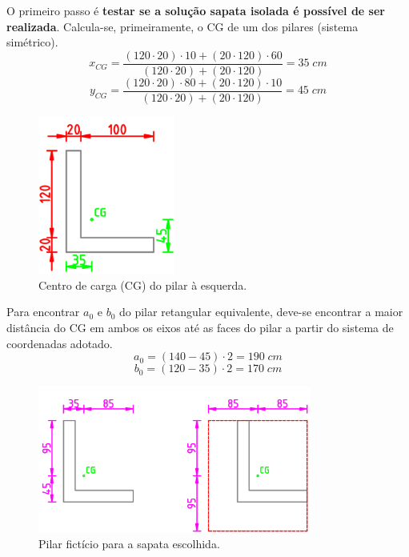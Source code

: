 O primeiro passo é \textbf{testar se a solução sapata isolada é possível de ser realizada}. Calcula-se, primeiramente, o CG de um dos pilares (sistema simétrico).
$$x_{CG}=\frac{(120\cdot20)\cdot10+(20\cdot120)\cdot60}{(120\cdot20)+(20\cdot120)}=35\;cm$$ 
$$y_{CG}=\frac{(120\cdot20)\cdot80+(20\cdot120)\cdot10}{(120\cdot20)+(20\cdot120)}=45\;cm$$
\begin{figure}[H]
	\begin{center}
	\caption{Centro de carga (CG) do pilar à esquerda.}
    	\includegraphics[width=0.4\textwidth]{Fundacoes-rasas-ou-diretas/Imagens/Exercicio-1-Sapata-conjugada-parte2.png}
	\end{center}
\end{figure}

Para encontrar $a_0$ e $b_0$ do pilar retangular equivalente, deve-se encontrar a maior distância do CG em ambos os eixos até as faces do pilar a partir do sistema de coordenadas adotado.
$$a_0=(140-45)\cdot2=190\;cm$$
$$b_0=(120-35)\cdot2=170\;cm$$
\begin{figure}[H]
	\begin{center}
	\caption{Pilar fictício para a sapata escolhida.}
    	\includegraphics[width=0.8\textwidth]{Fundacoes-rasas-ou-diretas/Imagens/Exercicio-1-Sapata-conjugada-parte3.png}
	\end{center}
\end{figure}


